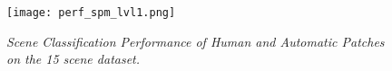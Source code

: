 \documentclass[10pt,twocolumn,letterpaper]{article}
\begin{document}
\begin{figure}
\centering
 \texttt{[image: perf\_spm\_lvl1.png]}
 \caption{\small\textit{Scene Classification Performance of Human and Automatic Patches on the 15 scene dataset.} }


\vspace{-4mm}

\label{fig:results}
\end{figure}
\end{document}
